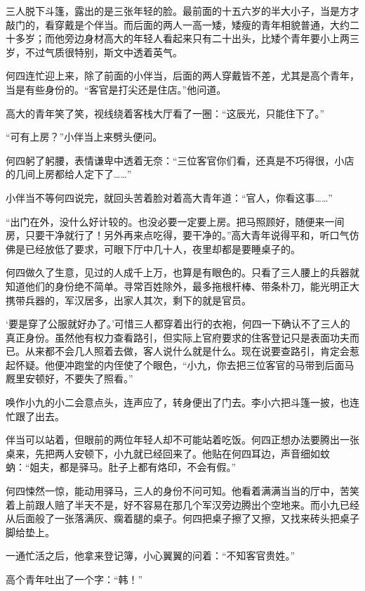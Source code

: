 三人脱下斗篷，露出的是三张年轻的脸。最前面的十五六岁的半大小子，当是方才敲门的，看穿戴是个伴当。而后面的两人一高一矮，矮瘦的青年相貌普通，大约二十多岁；而他旁边身材高大的年轻人看起来只有二十出头，比矮个青年要小上两三岁，不过气质很特别，斯文中透着英气。

何四连忙迎上来，除了前面的小伴当，后面的两人穿戴皆不差，尤其是高个青年，当是有些身份的。“客官是打尖还是住店。”他问道。

高大的青年笑了笑，视线绕着客栈大厅看了一圈：“这辰光，只能住下了。”

“可有上房？”小伴当上来劈头便问。

何四躬了躬腰，表情谦卑中透着无奈：“三位客官你们看，还真是不巧得很，小店的几间上房都给人定下了……”

小伴当不等何四说完，就回头苦着脸对着高大青年道：“官人，你看这事……”

“出门在外，没什么好计较的。也没必要一定要上房。把马照顾好，随便来一间房，只要干净就行了！另外再来点吃得，要干净的。”高大青年说得平和，听口气仿佛是已经放低了要求，可眼下厅中几十人，夜里却都是要睡桌子的。

何四做久了生意，见过的人成千上万，也算是有眼色的。只看了三人腰上的兵器就知道他们的身份绝不简单。寻常百姓除外，最多拖根杆棒、带条朴刀，能光明正大携带兵器的，军汉居多，出家人其次，剩下的就是官员。

‘要是穿了公服就好办了。’可惜三人都穿着出行的衣袍，何四一下确认不了三人的真正身份。虽然他有权力查看路引，但实际上官府要求的住客登记只是表面功夫而已。从来都不会几人照着去做，客人说什么就是什么。现在说要查路引，肯定会惹起怀疑。他便冲跑堂的内侄使了个眼色，“小九，你去把三位客官的马带到后面马厩里安顿好，不要失了照看。”

唤作小九的小二会意点头，连声应了，转身便出了门去。李小六把斗篷一披，也连忙跟了出去。

伴当可以站着，但眼前的两位年轻人却不可能站着吃饭。何四正想办法要腾出一张桌来，先把两人安顿下，小九就已经回来了。他贴在何四耳边，声音细如蚊蚋：“姐夫，都是驿马。肚子上都有烙印，不会有假。”

何四悚然一惊，能动用驿马，三人的身份不问可知。他看着满满当当的厅中，苦笑着上前跟人赔了半天不是，好不容易在那几个军汉旁边腾出个空地来。而小九已经从后面般了一张落满灰、瘸着腿的桌子。何四把桌子擦了又擦，又找来砖头把桌子脚给垫上。

一通忙活之后，他拿来登记簿，小心翼翼的问着：“不知客官贵姓。”

高个青年吐出了一个字：“韩！”

